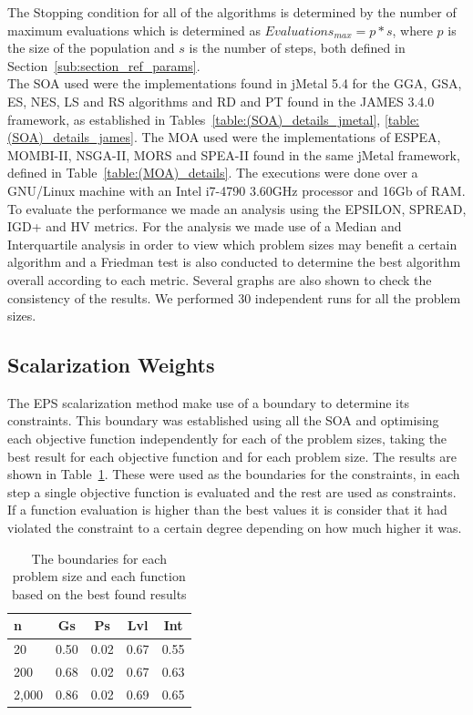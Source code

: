 The Stopping condition for all of the algorithms is determined by the number of maximum evaluations which is determined as $Evaluations_{max} = p * s$, where $p$ is the size of the population and $s$ is the number of steps, both defined in Section~\ref{sub:section_ref_params}.\\

The SOA used were the implementations found in jMetal 5.4 for the GGA, GSA, ES, NES, LS and RS algorithms and RD and PT found in the JAMES 3.4.0 framework, as established in Tables~\ref{table:(SOA)_details_jmetal}, \ref{table:(SOA)_details_james}. The MOA used were the implementations of ESPEA, MOMBI-II, NSGA-II, MORS and SPEA-II found in the same jMetal framework, defined in Table~\ref{table:(MOA)_details}. The executions were done over a GNU/Linux machine with an Intel i7-4790 3.60GHz processor and 16Gb of RAM.\\

To evaluate the performance we made an analysis using the EPSILON, SPREAD, IGD+ and HV metrics. For the analysis we made use of a Median and Interquartile analysis in order to view which problem sizes may benefit a certain algorithm and a Friedman test is also conducted to determine the best algorithm overall according to each metric. Several graphs are also shown to check the consistency of the results. We performed 30 independent runs for all the problem sizes.\\

\subsection{Scalarization Weights}

The EPS scalarization method make use of a boundary to determine its constraints. This boundary was established using all the SOA and optimising each objective function independently for each of the problem sizes, taking the best result for each objective function and for each problem size. The results are shown in Table~\ref{tab:best_independant_results}. These were used as the boundaries for the constraints, in each step a single objective function is evaluated and the rest are used as constraints. If a function evaluation is higher than the best values it is consider that it had violated the constraint to a certain degree depending on how much higher it was.\\

\par
\begin{table}[!htp]
\centering
\begin{tabular}{lcccc}
\hline
n     & Gs   & Ps   & Lvl  & Int  \\ \hline
20    & 0.50 & 0.02 & 0.67 & 0.55 \\
200   & 0.68 & 0.02 & 0.67 & 0.63 \\
2,000 & 0.86 & 0.02 & 0.69 & 0.65 \\ \hline
\end{tabular}%
\caption{The boundaries for each problem size and each function based on the best found results}
\label{tab:best_independant_results}
\end{table}

